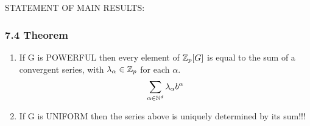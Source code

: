 STATEMENT OF MAIN RESULTS:
\subsubsection*{7.4 Theorem}
\begin{enumerate}
\item If G is POWERFUL then every element of $\mathbb Z_p[G]$ is equal to the sum of a convergent series, with $\lambda_\alpha\in\mathbb Z_p$ for each $\alpha$.
$$\sum_{\alpha\in\mathbb N^d} \lambda_\alpha b^\alpha$$
\item If G is UNIFORM then the series above is uniquely determined by its sum!!!
\end{enumerate}